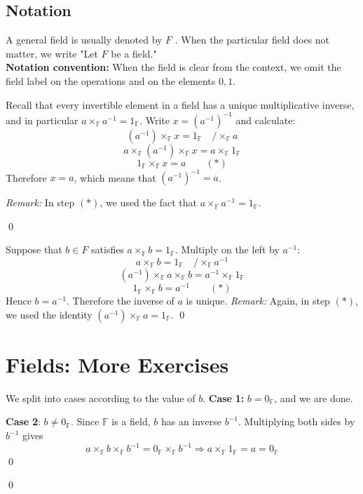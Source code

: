 \subsection{Notation}
A general field is usually denoted by $F$ . When the particular field does not matter, we write "Let $F$ be a field."
\\
\textbf{Notation convention:} When the field is clear from the context, we omit the field label on the operations and on the elements $0,1$.

{
Recall that every invertible element in a field has a unique multiplicative inverse, and in particular $a\times_{\mathbb{F}} a^{-1}=1_{\mathbb{F}}$.
Write $x=(a^{-1})^{-1}$ and calculate:
\[
(a^{-1})\times_{\mathbb{F}} x=1_{\mathbb{F}} \quad / \times_{\mathbb{F}} a
\]
\[
a\times_{\mathbb{F}} (a^{-1})\times_{\mathbb{F}} x = a\times_{\mathbb{F}} 1_{\mathbb{F}}
\]
\[
1_{\mathbb{F}}\times_{\mathbb{F}} x = a \qquad (*)
\]
Therefore $x=a$, which means that $(a^{-1})^{-1}=a$.

\emph{Remark:} In step $(*)$, we used the fact that $a\times_{\mathbb{F}} a^{-1}=1_{\mathbb{F}}$.
}
\qed

{
Suppose that $b\in F$ satisfies $a\times_{\mathbb{F}} b=1_{\mathbb{F}}$. Multiply on the left by $a^{-1}$:
\[
a\times_{\mathbb{F}} b = 1_{\mathbb{F}} \quad / \times_{\mathbb{F}} a^{-1}
\]
\[
(a^{-1})\times_{\mathbb{F}} a\times_{\mathbb{F}} b = a^{-1}\times_{\mathbb{F}} 1_{\mathbb{F}}
\]
\[
1_{\mathbb{F}}\times_{\mathbb{F}} b = a^{-1} \qquad (*)
\]
Hence $b=a^{-1}$. Therefore the inverse of $a$ is unique.
\emph{Remark:} Again, in step $(*)$, we used the identity $(a^{-1})\times_{\mathbb{F}} a=1_{\mathbb{F}}$.
}
\qed

\section{Fields: More Exercises}

{
We split into cases according to the value of $b$. \textbf{Case }\textbf{1}\textbf{:}
$b=0_{\mathbb{F}}$, and we are done.

\textbf{Case }\textbf{2}: $b\neq0_{\mathbb{F}}$. Since $\mathbb{F}$ is a field, $b$ has an inverse $b^{-1}$. Multiplying both sides by $b^{-1}$ gives
\[
a \times_{\mathbb{F}} b \times_{\mathbb{F}} b^{-1}=0_{\mathbb{F}}\times_{\mathbb{F}} b^{-1}
\Longrightarrow a\times_{\mathbb{F}} 1_{\mathbb{F}}=a=0_{\mathbb{F}}
\]
\qed
}
\qed

